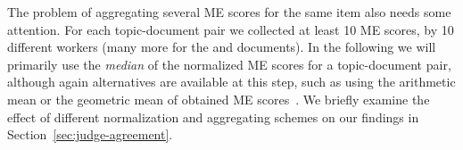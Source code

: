 

The problem of aggregating several ME 
scores for the same item also needs some attention. 
For each topic-document pair we collected at least 10 ME scores, by 10
different workers (many more for the \nkn and \hkh documents). 
In the following we will primarily use the \emph{median} of the
normalized ME scores for a topic-document pair, although again
alternatives are available at this step, such as using the arithmetic
mean or the geometric mean of obtained ME
scores~\cite{moskowitz:1977}. 
We briefly examine the effect of different normalization and
aggregating schemes on our findings in
Section~\ref{sec:judge-agreement}.

